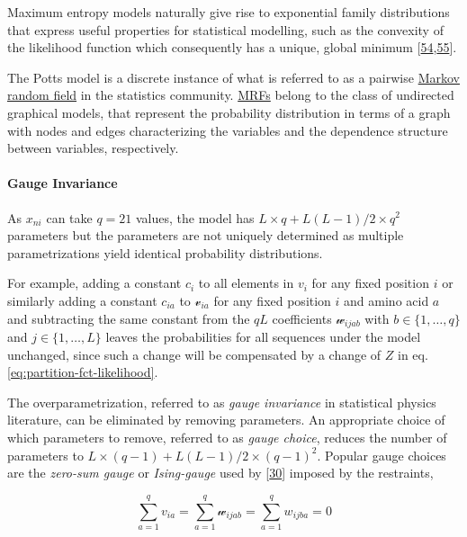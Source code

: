 \documentclass[12pt,a4paper,twoside]{book}
\newcommand{\via}{\mathcal{v}_{ia}}
\newcommand{\wijab}{\mathcal{w}_{ijab}}
\theoremstyle{definition}
\theoremstyle{definition}
\theoremstyle{remark}
\begin{document}
Maximum entropy models naturally give rise to exponential family
distributions that express useful properties for statistical modelling,
such as the convexity of the likelihood function which consequently has
a unique, global minimum
{[}\protect\hyperlink{ref-Wainwright2007}{54},\protect\hyperlink{ref-Murphy2012}{55}{]}.

The Potts model is a discrete instance of what is referred to as a
pairwise \protect\hyperlink{abbrev}{Markov random field} in the
statistics community. \protect\hyperlink{abbrev}{MRFs} belong to the
class of undirected graphical models, that represent the probability
distribution in terms of a graph with nodes and edges characterizing the
variables and the dependence structure between variables, respectively.

\hypertarget{gauge-invariance}{\paragraph{Gauge
Invariance}\label{gauge-invariance}}

As \(x_{ni}\) can take \(q=21\) values, the model has
\(L \! \times \! q + L(L-1)/2 \! \times \! q^2\) parameters but the
parameters are not uniquely determined as multiple parametrizations
yield identical probability distributions.

For example, adding a constant \(c_i\) to all elements in \(v_i\) for
any fixed position \(i\) or similarly adding a constant \(c_{ia}\) to
\(\via\) for any fixed position \(i\) and amino acid \(a\) and
subtracting the same constant from the \(qL\) coefficients \(\wijab\)
with \(b \in \{1, \ldots, q\}\) and \(j \in \{1, \ldots, L \}\) leaves
the probabilities for all sequences under the model unchanged, since
such a change will be compensated by a change of \(Z\) in eq.
\eqref{eq:partition-fct-likelihood}.

The overparametrization, referred to as \emph{gauge invariance} in
statistical physics literature, can be eliminated by removing
parameters. An appropriate choice of which parameters to remove,
referred to as \emph{gauge choice}, reduces the number of parameters to
\(L \! \times \! (q-1) + L(L-1)/2 \! \times \! (q-1)^2\). Popular gauge
choices are the \emph{zero-sum gauge} or \emph{Ising-gauge} used by
{[}\protect\hyperlink{ref-Weigt2009}{30}{]} imposed by the restraints,

\begin{equation}
    \sum_{a=1}^{q} v_{ia} = \sum_{a=1}^{q} \wijab = \sum_{a=1}^{q} w_{ijba} = 0
\label{eq:zero-sum-gauge}
\end{equation}
\end{document}
